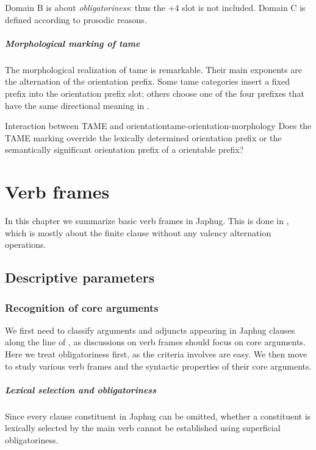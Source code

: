 \documentclass[a4paper, oneside, 12pt]{report}
\newcommand*{\citetable}[1]{Table~{#1}}
\newcommand*{\citepage}[1]{p.~{#1}}
\begin{document}
Domain B is about \emph{obligatoriness}:
thus the +4 slot is not included.
Domain C is defined according to prosodic reasons.

\paragraph*{Morphological marking of \ac{tame}}
The morphological realization of \ac{tame} is remarkable.
Their main exponents are the alternation of the orientation prefix.
Some \acs{tame} categories insert a fixed prefix 
into the orientation prefix slot;
others choose one of the four prefixes that have the same directional meaning 
in \citet[\citetable{15.1}]{jacques2021grammar}. 

\begin{todobox}{Interaction between TAME and orientation}{tame-orientation-morphology}
    Does the TAME marking override the lexically determined orientation prefix 
    or the semantically significant orientation prefix of a orientable prefix?
\end{todobox}

\chapter{Verb frames}

In this chapter we summarize basic verb frames in Japhug.
This is done in \citet[\citepage{14}]{jacques2021grammar},
which is mostly about the finite clause without any valency alternation operations.

\section{Descriptive parameters}

\subsection{Recognition of core arguments}\label{sec:verb-frame.standard}

We first need to classify arguments and adjuncts appearing in Japhug clauses
along the line of ,
as discussions on verb frames should focus on core arguments.
Here we treat obligatoriness first,
as the criteria involves are easy.
We then move to study various verb frames and the syntactic properties of their core arguments.

\paragraph*{Lexical selection and obligatoriness}
Since every clause constituent in Japhug can be omitted,
whether a constituent is lexically selected by the main verb
cannot be established using superficial obligatoriness.
\end{document}
